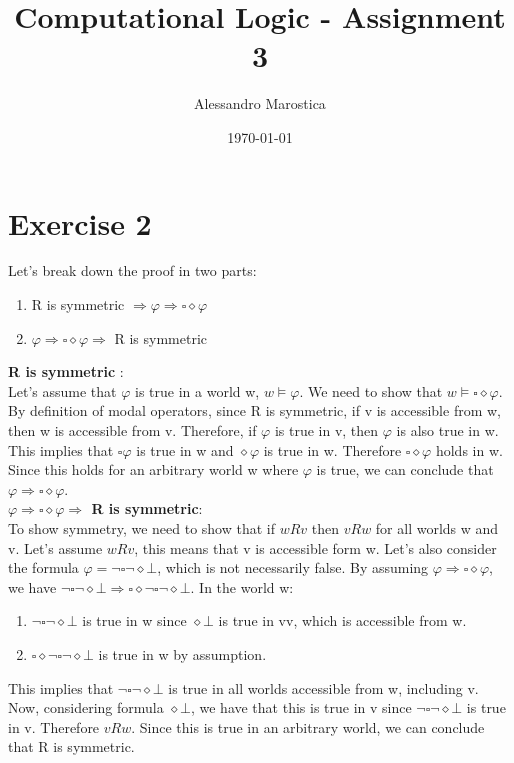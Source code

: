 \documentclass[11pt]{exam}
\title{Computational Logic - Assignment 3}
\author{Alessandro Marostica}
\date{\today}
\begin{document}
\maketitle
\section*{Exercise 2}
Let's break down the proof in two parts:
\begin{enumerate}
    \item R is symmetric \(\Rightarrow \varphi \Rightarrow \square \diamond \varphi\)
    \item \(\varphi \Rightarrow \square \diamond \varphi \Rightarrow\) R is symmetric
\end{enumerate}
\textbf{R is symmetric} \boldmath{\(\Rightarrow \varphi \Rightarrow \square \diamond \varphi\)}: \\
Let's assume that \(\varphi\) is true in a world w, \(w \vDash \varphi\). We need to show that \(w \vDash \square \diamond \varphi\).
By definition of modal operators, since R is symmetric, if v is accessible from w, then w is accessible from v. Therefore, if \(\varphi\) is true in v, then \(\varphi\) is also true in w.
This implies that \(\square \varphi\) is true in w and \(\diamond \varphi\) is true in w. Therefore \(\square \diamond \varphi\) holds in w.
Since this holds for an arbitrary world w where \(\varphi\) is true, we can conclude that \(\varphi \Rightarrow \square \diamond \varphi\). \\
\textbf{\(\varphi \Rightarrow \square \diamond \varphi \Rightarrow\) R is symmetric}: \\
To show symmetry, we need to show that if \(wRv\) then \(vRw\) for all worlds w and v.
Let's assume \(wRv\), this means that v is accessible form w.
Let's also consider the formula \(\varphi = \neg \square \neg \diamond \bot \), which is not necessarily false. By assuming \(\varphi \Rightarrow \square \diamond \varphi\), we have \(\neg \square \neg \diamond \bot \Rightarrow \square \diamond \neg \square \neg \diamond \bot\).
In the world w:
\begin{enumerate}
    \item \(\neg \square \neg \diamond \bot\) is true in w since \(\diamond \bot\) is true in vv, which is accessible from w.
    \item \(\square \diamond \neg \square \neg \diamond \bot\) is true in w by assumption.
\end{enumerate}
This implies that \(\neg \square \neg \diamond \bot\) is true in all worlds accessible from w, including v.
Now, considering formula \(\diamond \bot\), we have that this is true in v since \(\neg \square \neg \diamond \bot\) is true in v. Therefore \(vRw\).
Since this is true in an arbitrary world, we can conclude that R is symmetric.
\end{document}
